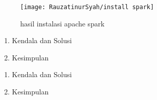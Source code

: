 \begin{figure}[!ht]
\texttt{[image: RauzatinurSyah/install spark]}
\caption{hasil instalasi apache spark }
\label{gam:hasil instalasi spark}
\end{figure}


\begin{enumerate}
\item Kendala dan Solusi

\item Kesimpulan

\end{enumerate}


\begin{enumerate}
\item Kendala dan Solusi

\item Kesimpulan

\end{enumerate}

